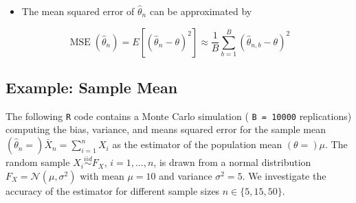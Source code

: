 \documentclass[
  letterpaper,
  DIV=11,
  numbers=noendperiod]{scrreprt}
\providecommand{\tightlist}{%
  \setlength{\itemsep}{0pt}\setlength{\parskip}{0pt}}\usepackage{longtable,booktabs,array}
\theoremstyle{definition}
\theoremstyle{plain}
\theoremstyle{plain}
\theoremstyle{remark}
\begin{document}
\begin{itemize}
\tightlist
\item
  The mean squared error of \(\hat\theta_n\) can be approximated by
\end{itemize}

\[
\operatorname{MSE}\left(\hat\theta_n\right)=E\left[\left(\hat\theta_n - \theta\right)^2\right]\approx\frac{1}{B}\sum_{b=1}^B \left(\hat\theta_{n,b} - \theta\right)^2
\]

\hypertarget{example-sample-mean}{%
\subsection*{Example: Sample Mean}\label{example-sample-mean}}

The following \texttt{R} code contains a Monte Carlo simulation (
\texttt{B\ =\ 10000} replications) computing the bias, variance, and
means squared error for the sample mean
\((\hat\theta_n=)\bar{X}_n=\sum_{i=1}^nX_i\) as the estimator of the
population mean \((\theta=)\mu\). The random sample
\(X_i\overset{iid}{\sim}F_X\), \(i=1,\dots,n\), is drawn from a normal
distribution \(F_X=\mathcal{N}(\mu,\sigma^2)\) with mean \(\mu=10\) and
variance \(\sigma^2=5\). We investigate the accuracy of the estimator
for different sample sizes \(n\in\{5,15,50\}\).
\end{document}
